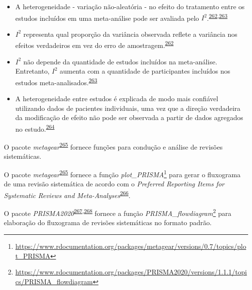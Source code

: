 \documentclass[
  a4paper,
]{book}
\renewcommand{\href}[2]{#2\footnote{\url{#1}}}
\newenvironment{infobox}[1]
  {
  \begin{itemize}
  \renewcommand{\labelitemi}{
    \raisebox{-.7\height}[0pt][0pt]{
      {\setkeys{Gin}{width=3em,keepaspectratio}
        \texttt{[image: \#1]}}
    }
  }
  \setlength{\fboxsep}{1em}
  \begin{blackbox}
  \item
  }
  {
  \end{blackbox}
  \end{itemize}
  }
\begin{document}
\begin{itemize}
\item
  A heterogeneidade - variação não-aleatória - no efeito do tratamento entre os estudos incluídos em uma meta-análise pode ser avaliada pelo \(I^{2}\).\textsuperscript{\protect\hyperlink{ref-Borenstein2022}{262},\protect\hyperlink{ref-Ruxfccker2008}{263}}
\item
  \(I^{2}\) representa qual proporção da variância observada reflete a variância nos efeitos verdadeiros em vez do erro de amostragem.\textsuperscript{\protect\hyperlink{ref-Borenstein2022}{262}}
\item
  \(I^{2}\) não depende da quantidade de estudos incluídos na meta-análise. Entretanto, \(I^{2}\) aumenta com a quantidade de participantes incluídos nos estudos meta-analisados.\textsuperscript{\protect\hyperlink{ref-Ruxfccker2008}{263}}
\item
  A heterogeneidade entre estudos é explicada de modo mais confiável utilizando dados de pacientes individuais, uma vez que a direção verdadeira da modificação de efeito não pode ser observada a partir de dados agregados no estudo.\textsuperscript{\protect\hyperlink{ref-degrooth2023}{264}}
\end{itemize}

\begin{infobox}{images/Rlogo}
O pacote \emph{metagear}\textsuperscript{\protect\hyperlink{ref-metagear}{265}} fornece funções para condução e análise de revisões sistemáticas.

\end{infobox}

\begin{infobox}{images/Rlogo}
O pacote \emph{metagear}\textsuperscript{\protect\hyperlink{ref-metagear}{265}} fornece a função \href{https://www.rdocumentation.org/packages/metagear/versions/0.7/topics/plot_PRISMA}{\emph{plot\_PRISMA}} para gerar o fluxograma de uma revisão sistemática de acordo com o \emph{Preferred Reporting Items for Systematic Reviews and Meta-Analyses}\textsuperscript{\protect\hyperlink{ref-Moher2015}{266}}.

\end{infobox}

\begin{infobox}{images/Rlogo}
O pacote \emph{PRISMA2020}\textsuperscript{\protect\hyperlink{ref-PRISMA2020-2}{267},\protect\hyperlink{ref-PRISMA2020}{268}} fornece a função \href{https://www.rdocumentation.org/packages/PRISMA2020/versions/1.1.1/topics/PRISMA_flowdiagram}{\emph{PRISMA\_flowdiagram}} para elaboração do fluxograma de revisões sistemáticas no formato padrão.

\end{infobox}
\end{document}

